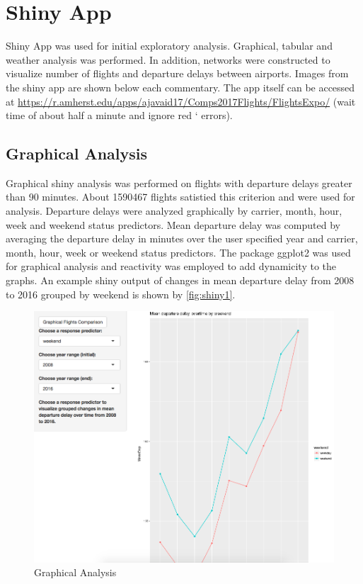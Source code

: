 \documentclass[12pt,twoside]{amherstthesis}
\begin{document}
  \section{Shiny App}\label{shiny-app}
  
  Shiny App was used for initial exploratory analysis. Graphical, tabular
  and weather analysis was performed. In addition, networks were
  constructed to visualize number of flights and departure delays between
  airports. Images from the shiny app are shown below each commentary. The
  app itself can be accessed at
  \url{https://r.amherst.edu/apps/ajavaid17/Comps2017Flights/FlightsExpo/}
  (wait time of about half a minute and ignore red ` errors).
  
  \subsection{Graphical Analysis}\label{graphical-analysis}
  
  Graphical shiny analysis was performed on flights with departure delays
  greater than 90 minutes. About 1590467 flights satistied this criterion
  and were used for analysis. Departure delays were analyzed graphically
  by carrier, month, hour, week and weekend status predictors. Mean
  departure delay was computed by averaging the departure delay in minutes
  over the user specified year and carrier, month, hour, week or weekend
  status predictors. The package ggplot2 was used for graphical analysis
  and reactivity was employed to add dynamicity to the graphs. An example
  shiny output of changes in mean departure delay from 2008 to 2016
  grouped by weekend is shown by \autoref{fig:shiny1}.
  
  \begin{figure}[htbp]
  \centering
  \includegraphics[scale = 0.5,angle = 0]{figure/AppFlights1.png}
  \caption[Graphical Analysis]{\normalsize{Graphical Analysis}}
  \label{fig:shiny1}
  \end{figure}
  
\end{document}
